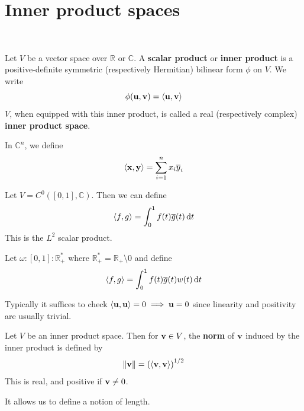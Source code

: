 \documentclass[a4paper]{article}
\begin{document}
\section{Inner product spaces}
\ \vspace*{-1.5em}
\begin{definition}
	Let \( V \) be a vector space over \( \mathbb R \) or \( \mathbb C \).
	A \textbf{scalar product} or \textbf{inner product} is a positive-definite symmetric (respectively Hermitian) bilinear form \( \phi \) on \( V \).
	We write
	\[
		\phi({\bf u},{\bf v}) = \left\langle{{\bf u},{\bf v}}\right\rangle
	\]
	\( V \), when equipped with this inner product, is called a real (respectively complex) \textbf{inner product space}.
\end{definition}
\begin{example}
	In \( \mathbb C^n \), we define
	\[
		\left\langle{{\bf x},{\bf y}}\right\rangle = \sum_{i=1}^n x_i \overline y_i
	\]
\end{example}
\begin{example}
	Let \( V = C^0([0,1], \mathbb C) \).
	Then we can define
	\[
		\left\langle{f,g}\right\rangle = \int_0^1 f(t) \overline g(t) \dd{t}
	\]
	This is the \( L^2 \) scalar product.
\end{example}
\begin{example}
	Let \( \omega \colon [0,1] \colon \mathbb R^*_+ \) where \( \mathbb R^*_+ = \mathbb R_+ \setminus \qty{0} \) and define
	\[
		\left\langle{f,g}\right\rangle = \int_0^1 f(t) \overline g(t) w(t) \dd{t}
	\]
\end{example}
\begin{remark}
	Typically it suffices to check \( \left\langle{{\bf u},{\bf u}}\right\rangle = 0 \implies {\bf u} = 0 \) since linearity and positivity are usually trivial.
\end{remark}
\begin{definition}
	Let \( V \) be an inner product space.
	Then for \( {\bf v} \in V \), the \textbf{norm} of \( {\bf v} \) induced by the inner product is defined by
	\[
		\norm{{\bf v}} = \qty(\left\langle{{\bf v},{\bf v}}\right\rangle)^{1/2}
	\]
	This is real, and positive if \( {\bf v} \neq 0 \).
\end{definition}
It allows us to define a notion of length. 
\end{document}
